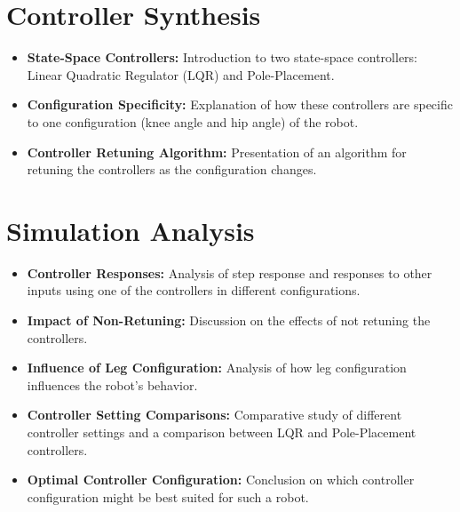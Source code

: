 \section{Controller Synthesis}
\begin{itemize}
	\item \textbf{State-Space Controllers:} Introduction to two state-space controllers: Linear Quadratic Regulator (LQR) and Pole-Placement.
	\item \textbf{Configuration Specificity:} Explanation of how these controllers are specific to one configuration (knee angle and hip angle) of the robot.
	\item \textbf{Controller Retuning Algorithm:} Presentation of an algorithm for retuning the controllers as the configuration changes.
\end{itemize}

\section{Simulation Analysis}
\begin{itemize}
	\item \textbf{Controller Responses:} Analysis of step response and responses to other inputs using one of the controllers in different configurations.
	\item \textbf{Impact of Non-Retuning:} Discussion on the effects of not retuning the controllers.
	\item \textbf{Influence of Leg Configuration:} Analysis of how leg configuration influences the robot's behavior.
	\item \textbf{Controller Setting Comparisons:} Comparative study of different controller settings and a comparison between LQR and Pole-Placement controllers.
	\item \textbf{Optimal Controller Configuration:} Conclusion on which controller configuration might be best suited for such a robot.
\end{itemize}










	


